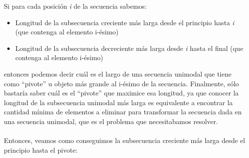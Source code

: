 Si para cada posición \textit{i} de la secuencia sabemos:
\begin{itemize}
	\item Longitud de la subsecuencia creciente más larga desde el principio hasta \textit{i} (que contenga al elemento i-ésimo)
	\item Longitud de la subsecuencia decreciente más larga desde \textit{i} hasta el final (que contenga al elemento i-ésimo)
\end{itemize}

entonces podemos decir cuál es el largo de una secuencia unimodal que tiene como ``pivote'' u objeto más grande al i-ésimo de la secuencia. Finalmente, sólo bastaría saber cuál es el ``pivote'' que maximice esa longitud, ya que conocer la longitud de la subsecuencia unimodal más larga es equivalente a encontrar la cantidad mínima de elementos a eliminar para transformar la secuencia dada en una secuencia unimodal, que es el problema que necesitabamos resolver.

\paragraph{}
Entonces, veamos como conseguimos la subsecuencia creciente más larga desde el principio hasta el pivote:


